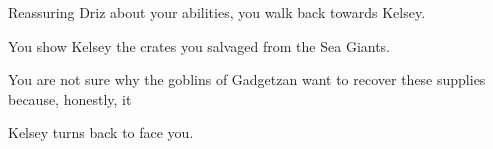 
Reassuring Driz about your abilities, you walk back towards Kelsey.



You show Kelsey the crates you salvaged from the Sea Giants.


You are not sure why the goblins of Gadgetzan want to recover these supplies because, honestly, it 




Kelsey turns back to face you.


